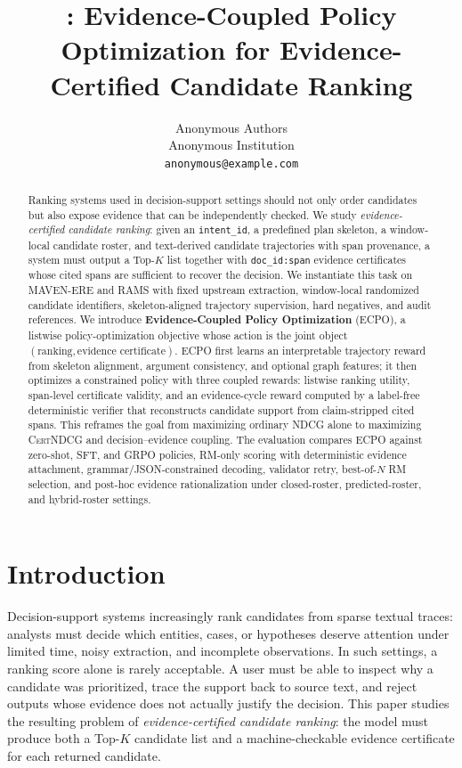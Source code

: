 \documentclass{article}
\title{\ECPO: Evidence-Coupled Policy Optimization for Evidence-Certified Candidate Ranking}
\author{
  Anonymous Authors \\
  Anonymous Institution \\
  \texttt{anonymous@example.com}
}
\newcommand{\ECPO}{\textsc{ECPO}}
\newcommand{\CertNDCG}{\textsc{CertNDCG}}
\begin{document}
\maketitle

\begin{abstract}
Ranking systems used in decision-support settings should not only order candidates but also expose evidence that can be independently checked. We study \emph{evidence-certified candidate ranking}: given an \texttt{intent\_id}, a predefined plan skeleton, a window-local candidate roster, and text-derived candidate trajectories with span provenance, a system must output a Top-$K$ list together with \texttt{doc\_id:span} evidence certificates whose cited spans are sufficient to recover the decision. We instantiate this task on MAVEN-ERE and RAMS with fixed upstream extraction, window-local randomized candidate identifiers, skeleton-aligned trajectory supervision, hard negatives, and audit references. We introduce \textbf{Evidence-Coupled Policy Optimization} (\ECPO), a listwise policy-optimization objective whose action is the joint object $(\text{ranking},\text{evidence certificate})$. \ECPO{} first learns an interpretable trajectory reward from skeleton alignment, argument consistency, and optional graph features; it then optimizes a constrained policy with three coupled rewards: listwise ranking utility, span-level certificate validity, and an evidence-cycle reward computed by a label-free deterministic verifier that reconstructs candidate support from claim-stripped cited spans. This reframes the goal from maximizing ordinary NDCG alone to maximizing \CertNDCG{} and decision--evidence coupling. The evaluation compares \ECPO{} against zero-shot, SFT, and GRPO policies, RM-only scoring with deterministic evidence attachment, grammar/JSON-constrained decoding, validator retry, best-of-$N$ RM selection, and post-hoc evidence rationalization under closed-roster, predicted-roster, and hybrid-roster settings.
\end{abstract}

\section{Introduction}
\label{sec:introduction}

Decision-support systems increasingly rank candidates from sparse textual traces: analysts must decide which entities, cases, or hypotheses deserve attention under limited time, noisy extraction, and incomplete observations. In such settings, a ranking score alone is rarely acceptable. A user must be able to inspect why a candidate was prioritized, trace the support back to source text, and reject outputs whose evidence does not actually justify the decision. This paper studies the resulting problem of \emph{evidence-certified candidate ranking}: the model must produce both a Top-$K$ candidate list and a machine-checkable evidence certificate for each returned candidate.
\end{document}
